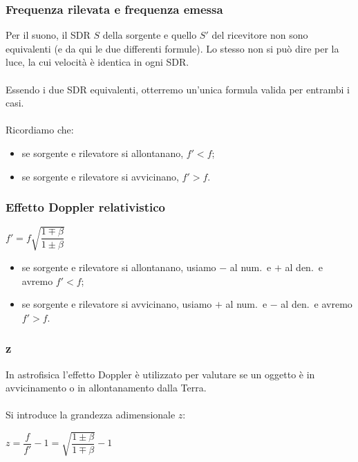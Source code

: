 \documentclass[]{beamer}
\theoremstyle{plain}
\begin{document}
\begin{frame}
\frametitle{Frequenza rilevata e frequenza emessa}
Per il suono, il SDR $ S $ della sorgente e quello $ S' $ del ricevitore non sono equivalenti (e da qui le \alert<1>{due differenti formule}). Lo stesso non si può dire per la luce, la cui velocità è identica in ogni SDR.\\~\\\pause
Essendo i due SDR equivalenti, otterremo \alert<2>{un'unica formula} valida per entrambi i casi.\\~\pause\\Ricordiamo che:
\begin{itemize}
  \item se sorgente e rilevatore \alert<3>{si allontanano}, \alert<3>{$f' < f $};\pause
  \item se sorgente e rilevatore \alert<4>{si avvicinano}, \alert<4>{$ f' > f $}.
 \end{itemize}
\end{frame}

\begin{frame}
\frametitle{Effetto Doppler relativistico}
\begin{center}
\colorbox{blue!30}{$ f' = f \sqrt{\dfrac{1 \mp \beta}{1 \pm \beta}} $}
\end{center}
\begin{itemize}
  \item se sorgente e rilevatore \alert<1>{si allontanano}, usiamo $ - $ al num.~e $ + $ al den.~e avremo \alert<1>{$ f' < f $};\pause
  \item se sorgente e rilevatore \alert<2>{si avvicinano}, usiamo $ + $ al num.~e $ - $ al den.~e avremo \alert<2>{$ f' > f $}.
 \end{itemize}
\end{frame}





\begin{frame}
\frametitle{z}
In astrofisica l'effetto Doppler è utilizzato per valutare se un oggetto è in avvicinamento o in allontanamento dalla Terra.\\~\pause\\
Si introduce la grandezza adimensionale $ z $:
\begin{center}
\colorbox{blue!30}{$ z = \dfrac{f}{f'} - 1 = \sqrt{\dfrac{1 \pm \beta}{1 \mp \beta}} -1 $}
\end{center}
\end{frame}
\end{document}
